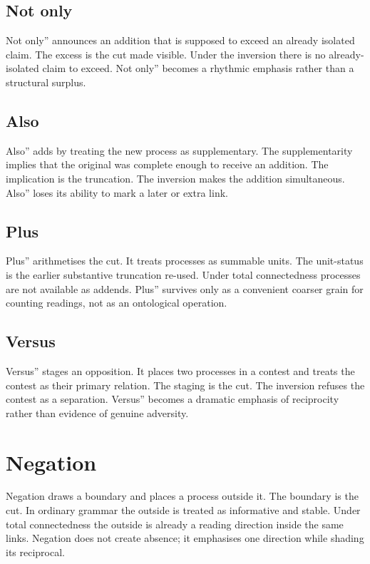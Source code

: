 \documentclass[11pt,a4paper]{article}
\begin{document}
\subsection{Not only} Not only'' announces an addition that is supposed to exceed an already isolated claim. The excess is the cut made visible. Under the inversion there is no already-isolated claim to exceed. Not only'' becomes a rhythmic emphasis rather than a structural surplus.

\subsection{Also} Also'' adds by treating the new process as supplementary. The supplementarity implies that the original was complete enough to receive an addition. The implication is the truncation. The inversion makes the addition simultaneous. Also'' loses its ability to mark a later or extra link.

\subsection{Plus} Plus'' arithmetises the cut. It treats processes as summable units. The unit-status is the earlier substantive truncation re-used. Under total connectedness processes are not available as addends. Plus'' survives only as a convenient coarser grain for counting readings, not as an ontological operation.

\subsection{Versus} Versus'' stages an opposition. It places two processes in a contest and treats the contest as their primary relation. The staging is the cut. The inversion refuses the contest as a separation. Versus'' becomes a dramatic emphasis of reciprocity rather than evidence of genuine adversity.

\section{Negation}

Negation draws a boundary and places a process outside it. The boundary is the cut. In ordinary grammar the outside is treated as informative and stable. Under total connectedness the outside is already a reading direction inside the same links. Negation does not create absence; it emphasises one direction while shading its reciprocal.
\end{document}
